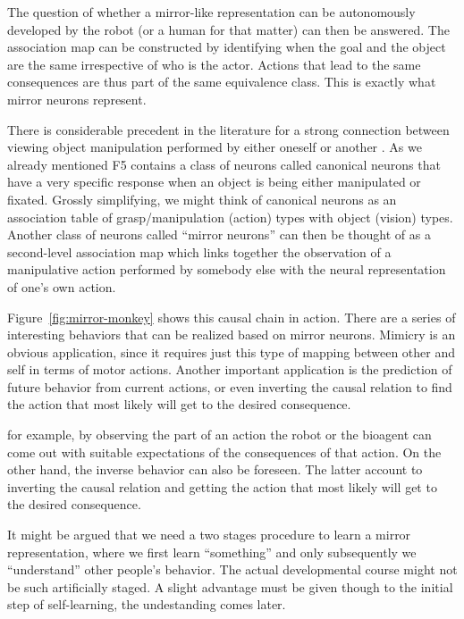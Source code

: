 The question of whether a mirror-like representation can be
autonomously developed by the robot (or a human for that matter) can
then be answered. The association map can be constructed by
identifying when the goal and the object are the same irrespective of
who is the actor. Actions that lead to the same consequences are thus
part of the same equivalence class.  This is exactly what mirror neurons
represent.


\ifverbose
There is considerable precedent in the literature for a strong
connection between viewing object manipulation performed by either
oneself or another \cite{wohlsclager02human}.  As we already mentioned
F5 contains a class of neurons called canonical neurons that have a
very specific response when an object is being either manipulated or
fixated.  Grossly simplifying, we might think of canonical neurons as
an association table of grasp/manipulation (action) types with object
(vision) types.  Another class of neurons called ``mirror neurons''
can then be thought of as a second-level association map which links
together the observation of a manipulative action performed by
somebody else with the neural representation of one's own action.
\fi

Figure~\ref{fig:mirror-monkey} shows this causal chain in action.
There are a series of interesting behaviors that can be realized based
on mirror neurons. Mimicry is an obvious application, since it
requires just this type of mapping between other and self in terms of
motor actions.  Another important application is the prediction of
future behavior from current actions, or even inverting the causal
relation to find the action that most likely will get to the desired
consequence.

\ifverbose

for example, by observing the part of an action the robot or the
bioagent can come out with suitable expectations of the consequences
of that action. On the other hand, the inverse behavior can also be
foreseen. The latter account to inverting the causal relation and
getting the action that most likely will get to the desired
consequence.

It might be argued that we need a two stages procedure to learn a
mirror representation, where we first learn ``something'' and only
subsequently we ``understand'' other people's behavior. The actual
developmental course might not be such artificially staged. A slight
advantage must be given though to the initial step of self-learning,
the undestanding comes later.



